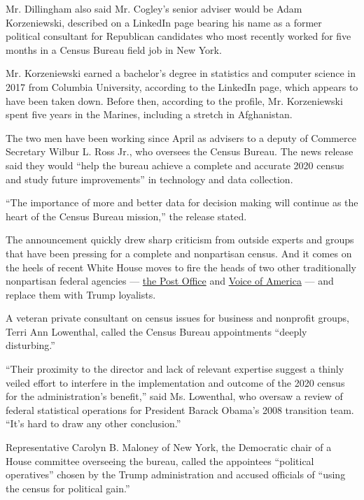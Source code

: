 Mr. Dillingham also said Mr. Cogley's senior adviser would be Adam
Korzeniewski, described on a LinkedIn page bearing his name as a former
political consultant for Republican candidates who most recently worked
for five months in a Census Bureau field job in New York.

Mr. Korzeniewski earned a bachelor's degree in statistics and computer
science in 2017 from Columbia University, according to the LinkedIn
page, which appears to have been taken down. Before then, according to
the profile, Mr. Korzeniewski spent five years in the Marines, including
a stretch in Afghanistan.

The two men have been working since April as advisers to a deputy of
Commerce Secretary Wilbur L. Ross Jr., who oversees the Census Bureau.
The news release said they would ``help the bureau achieve a complete
and accurate 2020 census and study future improvements'' in technology
and data collection.

``The importance of more and better data for decision making will
continue as the heart of the Census Bureau mission,'' the release
stated.

The announcement quickly drew sharp criticism from outside experts and
groups that have been pressing for a complete and nonpartisan census.
And it comes on the heels of recent White House moves to fire the heads
of two other traditionally nonpartisan federal agencies ---
\href{https://www.nytimes3xbfgragh.onion/2020/05/07/us/politics/postmaster-general-louis-dejoy.html}{the
Post Office} and
\href{https://www.nytimes3xbfgragh.onion/2020/06/15/us/politics/voice-of-american-resignations.html}{Voice
of America} --- and replace them with Trump loyalists.

A veteran private consultant on census issues for business and nonprofit
groups, Terri Ann Lowenthal, called the Census Bureau appointments
``deeply disturbing.''

``Their proximity to the director and lack of relevant expertise suggest
a thinly veiled effort to interfere in the implementation and outcome of
the 2020 census for the administration's benefit,'' said Ms. Lowenthal,
who oversaw a review of federal statistical operations for President
Barack Obama's 2008 transition team. ``It's hard to draw any other
conclusion.''

Representative Carolyn B. Maloney of New York, the Democratic chair of a
House committee overseeing the bureau, called the appointees ``political
operatives'' chosen by the Trump administration and accused officials of
``using the census for political gain.''

